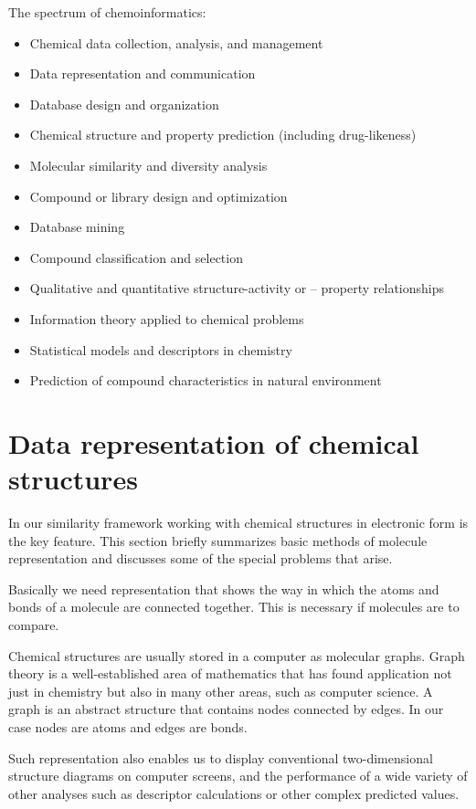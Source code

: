 \documentclass[thesis=M,english]{FITthesis}[2012/10/20]
\begin{document}
The spectrum of chemoinformatics:
\begin{itemize}
\item Chemical data collection, analysis, and management
\item Data representation and communication
\item Database design and organization
\item Chemical structure and property prediction (including drug-likeness)
\item Molecular similarity and diversity analysis
\item Compound or library design and optimization
\item Database mining
\item Compound classification and selection
\item Qualitative and quantitative structure-activity or – property relationships
\item Information theory applied to chemical problems
\item Statistical models and descriptors in chemistry
\item Prediction of compound characteristics in natural environment 
\end{itemize}

\section{Data representation of chemical structures}
\label{chemicalDataRef}
In our similarity framework working with chemical structures in electronic form is the key feature. This section briefly summarizes basic methods of molecule representation and discusses some of the special problems that arise.

Basically we need representation that shows the way in which the atoms and bonds of a molecule are connected together. This is necessary if molecules are to compare. 

Chemical structures are usually stored in a computer as molecular graphs. Graph theory is a well-established area of mathematics that has found application not just in chemistry but also in many other areas, such as computer science. A graph is an abstract structure that contains nodes connected by edges. In our case nodes are atoms and edges are bonds.

Such representation also enables us to display conventional two-dimensional structure diagrams on computer screens, and the performance of a wide variety of other analyses such as descriptor calculations or other complex predicted values.
\end{document}
